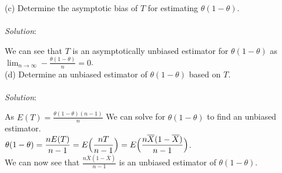 \documentclass[12pt]{article}
\newcommand{\XB}{\color{black}}
\newcommand{\XV}{\color{violet}}
\begin{document}


(c) Determine the asymptotic bias of $ T $ for estimating $ \theta(1 - \theta) $. \\
\vspace{2.5mm} \\
\textit{Solution}:
\vspace{2.5mm}

\noindent 
We can see that $ T $ is an asymptotically unbiased estimator for $ \theta(1 - \theta) $ as $ \displaystyle \lim_{n \to \infty} -\frac{\theta(1 - \theta)}{n} = 0 $. \\



(d) Determine an unbiased estimator of $ \theta(1 - \theta) $ based on $ T $. \\
\vspace{2.5mm} \\
\textit{Solution}:
\vspace{2.5mm}

\noindent 
As $ \displaystyle E(T) = \frac{\theta(1 - \theta)(n - 1)}{n} $ We can solve for $ \theta(1 - \theta) $ to find an unbiased estimator. \\

$ \displaystyle \theta(1 - \theta) = \frac{nE(T)}{n - 1} = E\Bigl( \frac{nT}{n - 1} \Bigr) = E\Bigl( \frac{n\overline{X}(1 - \overline{X})}{n - 1} \Bigr) $. \\

\noindent
We can now see that $ \displaystyle \frac{n\overline{X}(1 - \overline{X})}{n - 1} $ is an unbiased estimator of $ \theta(1 - \theta) $. \\

\end{document}
